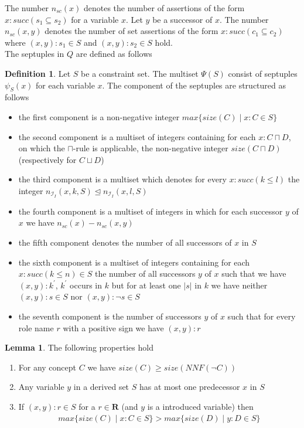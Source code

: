 \documentclass[a4paper,11pt]{scrartcl}
\theoremstyle{break}
\theoremstyle{definition}
\newtheorem{mydef}{Definition}
\newtheorem{mylem}{Lemma}
\begin{document}
The number $n_{sc}(x)$ denotes the number of assertions of the form $x:succ(s_1\subseteq s_2)$ for a variable $x$. Let $y$ be a successor of $x$. The number $n_{sc}(x,y)$ denotes the number of set assertions of the form $x:succ(c_1\subseteq c_2)$ where $(x,y):s_1\in S$ and $(x,y):s_2\in S$ hold.\\
The septuples in $Q$ are defined as follows
\begin{mydef}
Let $S$ be a constraint set. The multiset $\Psi(S)$ consist of septuples $\psi_S(x)$ for each variable $x$. The component of the septuples are structured as follows
\begin{itemize}
\item the first component is a non-negative integer $max\{size(C)\mid x:C\in S\}$
\item the second component is a multiset of integers containing for each $x:C\sqcap D$, on which the $\sqcap$-rule is applicable, the non-negative integer $size(C\sqcap D)$ (respectively for $C\sqcup D$)
\item the third component is a multiset which denotes for every $x:succ(k\leq l)$ the integer $n_{\mathcal{I}_I}(x,k,S)\unlhd n_{\mathcal{I}_I}(x,l,S)$
\item the fourth component is a multiset of integers in which for each successor $y$ of $x$ we have $n_{sc}(x)-n_{sc}(x,y)$
\item the fifth component denotes the number of all successors of $x$ in $S$
\item the sixth component is a multiset of integers containing for each $x:succ(k\leq n)\in S$ the number of all successors $y$ of $x$ such that we have $(x,y):k^\prime$, $k^\prime$ occurs in $k$ but for at least one $|s|$ in $k$ we have neither $(x,y):s\in S$ nor $(x,y):\neg s\in S$
\item the seventh component is the number of successors $y$ of $x$ such that for every role name $r$ with a positive sign we have $(x,y):r$
\end{itemize}
\end{mydef}
\begin{mylem}
The following properties hold
\begin{enumerate}
\item For any concept $C$ we have $size(C)\geq size(NNF(\neg C))$
 \item Any variable $y$ in a derived set $S$ has at most one predecessor $x$ in $S$
\item If $(x,y):r\in S$ for a $r\in\mathbf{R}$ (and $y$ is a introduced variable) then 
\begin{align*}
max\{size(C)\mid x:C\in S\}>max\{size(D)\mid y:D \in S\}
\end{align*}
\end{enumerate}
\end{mylem}
\end{document}
